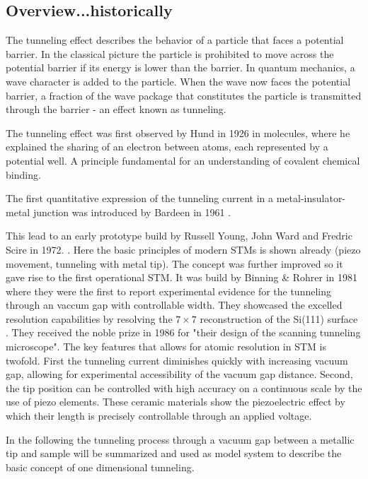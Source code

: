 \subsection{Overview...historically}
The tunneling effect describes the behavior of a particle that faces a potential barrier. In the classical picture the particle is prohibited to move across the potential barrier if its energy is lower than the barrier. In quantum mechanics, a wave character is added to the particle. When the wave now faces the potential barrier, a fraction of the wave package that constitutes the particle is transmitted through the barrier - an effect known as tunneling.

The tunneling effect was first observed by Hund in 1926 \cite{Mehra_tunneling_1982} in molecules, where he explained the sharing of an electron between atoms, each represented by a potential well. A principle fundamental for an understanding of covalent chemical binding. 

The first quantitative expression of the tunneling current in a metal-insulator-metal junction was introduced by Bardeen in 1961 \cite{Bardeen_tunneling_1961}. 

This lead to an early prototype build by Russell Young, John Ward and Fredric Scire in 1972. \cite{Young_topographiner_1972}. Here the basic principles of modern STMs is shown already (piezo movement, tunneling with metal tip). The concept was further improved so it gave rise to the first operational STM. It was build by Binning \& Rohrer in 1981 \cite{binning_tunneling_1982} where they were the first to report experimental evidence for the tunneling through an vaccum gap with controllable width. They showcased the excelled resolution capabilities by resolving the $7 \times 7$ reconstruction of the Si(111) surface \cite{binnig_1983}. They received the noble prize in 1986 \cite{_noble_price_1986} for "their design of the scanning tunneling microscope". The key features that allows for atomic resolution in STM is twofold. First the tunneling current diminishes quickly with increasing vacuum gap, allowing for experimental accessibility of the vacuum gap distance. Second, the tip position can be controlled with high accuracy on a continuous scale by the use of piezo elements. These ceramic materials show the piezoelectric effect \cite{Martin_Piezo_1972} by which their length is precisely controllable through an applied voltage.

In the following the tunneling process through a vacuum gap between a metallic tip and sample will be summarized and used as model system to describe the basic concept of one dimensional tunneling.

